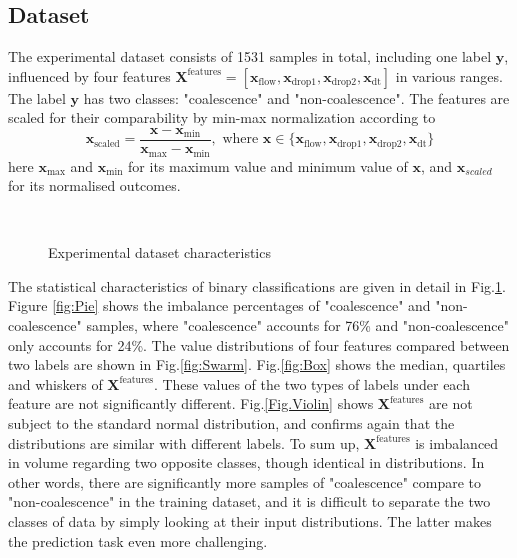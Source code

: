 \documentclass[twoside,twocolumn,9pt]{article}
\begin{document}
\subsection{Dataset} \label{Dataset}
The experimental dataset consists of 1531 samples in total, including one label $\textbf{y}$, influenced by four features $\textbf{X}^{\textrm{features}}=[\mathbf{x}_\textrm{flow}, \mathbf{x}_\textrm{drop1}, \mathbf{x}_\textrm{drop2}, \mathbf{x}_\textrm{dt}]$ in various ranges. The label $\textbf{y}$ has two classes:  "coalescence" and "non-coalescence". The features are scaled for their comparability by min-max normalization according to
\begin{equation}
\mathbf{x}_\textrm{scaled}=\frac{\mathbf{x}-\mathbf{x}_{\min}}{\mathbf{x}_{\max}-\mathbf{x}_{\min}}, \text{ where }\mathbf{x}\in {\{\mathbf{x}_\textrm{flow}, \mathbf{x}_\textrm{drop1}, \mathbf{x}_\textrm{drop2}, \mathbf{x}_\textrm{dt}\}}
\label{eq:normal}
\end{equation}
here $\mathbf{x}_{\max}$ and $\mathbf{x}_{\min}$ for its maximum value and minimum value of $\mathbf{x}$, and $\mathbf{x}_{scaled}$ for its normalised outcomes. 
\begin{figure}[!htb]
    \centering
    \\
    \caption{Experimental dataset characteristics}
    \label{fig:dataset}
\end{figure}

The statistical characteristics of binary classifications are given in detail in Fig.\ref{fig:dataset}. Figure \ref{fig:Pie} shows the imbalance percentages of "coalescence" and "non-coalescence" samples, where "coalescence" accounts for 76\% and "non-coalescence" only accounts for 24\%. The value distributions of four features compared between two labels are shown in Fig.\ref{fig:Swarm}. Fig.\ref{fig:Box} shows the median, quartiles and whiskers of $\textbf{X}^{\textrm{features}}$. These values of the two types of labels under each feature are not significantly different. Fig.\ref{Fig.Violin} shows $\textbf{X}^{\textrm{features}}$ are not subject to the standard normal distribution, and confirms again that the distributions are similar with different labels. 
To sum up, $\textbf{X}^{\textrm{features}}$ is imbalanced in volume regarding two opposite classes, though identical in distributions. In other words, there are significantly more samples of "coalescence" compare to "non-coalescence" in the training dataset, and it is difficult to separate the two classes of data by simply looking at their input distributions. The latter makes the prediction task even more challenging.
\end{document}
